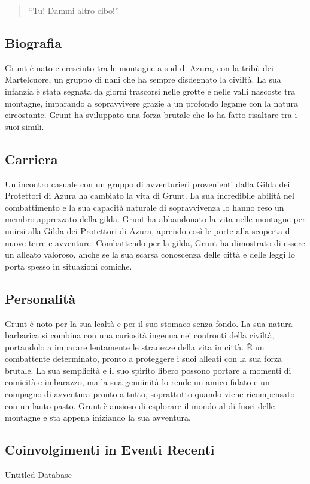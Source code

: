 \begin{quote}
``Tu! Dammi altro cibo!''
\end{quote}

\subsection{Biografia}\label{biografia}


Grunt è nato e cresciuto tra le montagne a sud di Azura, con la tribù
dei Martelcuore, un gruppo di nani che ha sempre disdegnato la civiltà.
La sua infanzia è stata segnata da giorni trascorsi nelle grotte e nelle
valli nascoste tra montagne, imparando a sopravvivere grazie a un
profondo legame con la natura circostante. Grunt ha sviluppato una forza
brutale che lo ha fatto risaltare tra i suoi simili.

\subsection{Carriera}\label{carriera}


Un incontro casuale con un gruppo di avventurieri provenienti dalla
Gilda dei Protettori di Azura ha cambiato la vita di Grunt. La sua
incredibile abilità nel combattimento e la sua capacità naturale di
sopravvivenza lo hanno reso un membro apprezzato della gilda. Grunt ha
abbandonato la vita nelle montagne per unirsi alla Gilda dei Protettori
di Azura, aprendo così le porte alla scoperta di nuove terre e
avventure. Combattendo per la gilda, Grunt ha dimostrato di essere un
alleato valoroso, anche se la sua scarsa conoscenza delle città e delle
leggi lo porta spesso in situazioni comiche.

\subsection{Personalità}\label{personalituxe0}

Grunt è noto per la sua lealtà e per il suo stomaco senza fondo. La sua
natura barbarica si combina con una curiosità ingenua nei confronti
della civiltà, portandolo a imparare lentamente le stranezze della vita
in città. È un combattente determinato, pronto a proteggere i suoi
alleati con la sua forza brutale. La sua semplicità e il suo spirito
libero possono portare a momenti di comicità e imbarazzo, ma la sua
genuinità lo rende un amico fidato e un compagno di avventura pronto a
tutto, soprattutto quando viene ricompensato con un lauto pasto. Grunt è
ansioso di esplorare il mondo al di fuori delle montagne e sta appena
iniziando la sua avventura.


\subsection{Coinvolgimenti in Eventi
Recenti}\label{coinvolgimenti-in-eventi-recenti}


\href{Untitled\%20Database\%203abb1ead1dea450c8b5bf8e09d4ba432.csv}{Untitled
Database}

